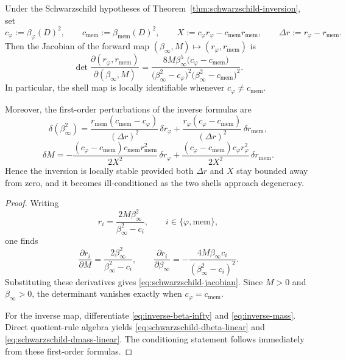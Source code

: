 \begin{proposition}\label{prop:schwarzschild-conditioning}
Under the Schwarzschild hypotheses of Theorem~\ref{thm:schwarzschild-inversion}, set
\[
c_\varphi:=\beta_\varphi(D)^2,
\qquad
c_{\mathrm{mem}}:=\beta_{\mathrm{mem}}(D)^2,
\qquad
X:=c_\varphi r_\varphi-c_{\mathrm{mem}}r_{\mathrm{mem}},
\qquad
\Delta r:=r_\varphi-r_{\mathrm{mem}}.
\]
Then the Jacobian of the forward map $(\beta_\infty,M)\mapsto(r_\varphi,r_{\mathrm{mem}})$ is
\begin{equation}\label{eq:schwarzschild-jacobian}
\det\frac{\partial(r_\varphi,r_{\mathrm{mem}})}{\partial(\beta_\infty,M)}
=
\frac{
8M\beta_\infty^5\bigl(c_\varphi-c_{\mathrm{mem}}\bigr)
}{
\bigl(\beta_\infty^2-c_\varphi\bigr)^2
\bigl(\beta_\infty^2-c_{\mathrm{mem}}\bigr)^2
}.
\end{equation}
In particular, the shell map is locally identifiable whenever $c_\varphi\neq c_{\mathrm{mem}}$.

Moreover, the first-order perturbations of the inverse formulas are
\begin{equation}\label{eq:schwarzschild-dbeta-linear}
\delta(\beta_\infty^2)
=
\frac{r_{\mathrm{mem}}(c_{\mathrm{mem}}-c_\varphi)}{(\Delta r)^2}\,\delta r_\varphi
+
\frac{r_\varphi(c_\varphi-c_{\mathrm{mem}})}{(\Delta r)^2}\,\delta r_{\mathrm{mem}},
\end{equation}
\begin{equation}\label{eq:schwarzschild-dmass-linear}
\delta M
=
-\frac{(c_\varphi-c_{\mathrm{mem}})c_{\mathrm{mem}}r_{\mathrm{mem}}^2}{2X^2}\,\delta r_\varphi
+
\frac{(c_\varphi-c_{\mathrm{mem}})c_\varphi r_\varphi^2}{2X^2}\,\delta r_{\mathrm{mem}}.
\end{equation}
Hence the inversion is locally stable provided both $\Delta r$ and $X$ stay bounded away from zero, and it becomes ill-conditioned as the two shells approach degeneracy.
\end{proposition}

\begin{proof}
Writing
\[
r_i=\frac{2M\beta_\infty^2}{\beta_\infty^2-c_i},
\qquad i\in\{\varphi,\mathrm{mem}\},
\]
one finds
\[
\frac{\partial r_i}{\partial M}
=
\frac{2\beta_\infty^2}{\beta_\infty^2-c_i},
\qquad
\frac{\partial r_i}{\partial\beta_\infty}
=
-\frac{4M\beta_\infty c_i}{(\beta_\infty^2-c_i)^2}.
\]
Substituting these derivatives gives \eqref{eq:schwarzschild-jacobian}. Since $M>0$ and $\beta_\infty>0$, the determinant vanishes exactly when $c_\varphi=c_{\mathrm{mem}}$.

For the inverse map, differentiate \eqref{eq:inverse-beta-infty} and \eqref{eq:inverse-mass}. Direct quotient-rule algebra yields \eqref{eq:schwarzschild-dbeta-linear} and \eqref{eq:schwarzschild-dmass-linear}. The conditioning statement follows immediately from these first-order formulas.
\end{proof}

